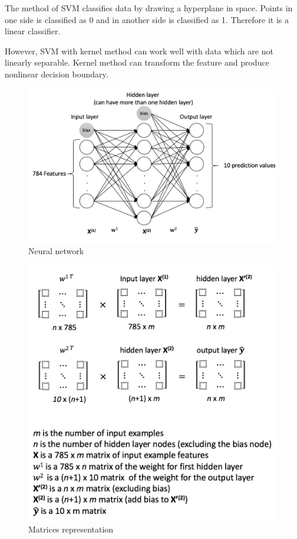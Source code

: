 \documentclass[11pt,letterpaper]{article}
\begin{document}
The method of SVM classifies data by drawing a hyperplane in space. Points in one side is classified as 0 and in another side is classified as 1. Therefore it is a linear classifier. 

However, SVM with kernel method can work well with data which are not linearly separable. Kernel method can transform the feature and produce nonlinear decision boundary.  

\begin{center}%
\begin{figure}
\includegraphics[scale=0.7]{net}
    \caption{Neural network}
      \label{neural network}

\end{figure}
\end{center}

\begin{center}
\begin{figure}
\includegraphics[scale=0.5]{matrix}
    \caption{Matrices representation}
      \label{matrices}
\end{figure}
\end{center}
\end{document}
